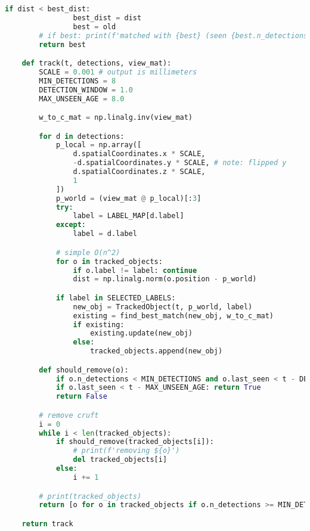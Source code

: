 \begin{lstlisting}[language=python,frame=single]
            if dist < best_dist:
                best_dist = dist
                best = old
        # if best: print(f'matched with {best} (seen {best.n_detections} time(s))')
        return best

    def track(t, detections, view_mat):
        SCALE = 0.001 # output is millimeters
        MIN_DETECTIONS = 8
        DETECTION_WINDOW = 1.0
        MAX_UNSEEN_AGE = 8.0

        w_to_c_mat = np.linalg.inv(view_mat)

        for d in detections:
            p_local = np.array([
                d.spatialCoordinates.x * SCALE,
                -d.spatialCoordinates.y * SCALE, # note: flipped y
                d.spatialCoordinates.z * SCALE,
                1
            ])
            p_world = (view_mat @ p_local)[:3]
            try:
                label = LABEL_MAP[d.label]
            except:
                label = d.label

            # simple O(n^2)
            for o in tracked_objects:
                if o.label != label: continue
                dist = np.linalg.norm(o.position - p_world)

            if label in SELECTED_LABELS:
                new_obj = TrackedObject(t, p_world, label)
                existing = find_best_match(new_obj, w_to_c_mat)
                if existing:
                    existing.update(new_obj)
                else:
                    tracked_objects.append(new_obj)

        def should_remove(o):
            if o.n_detections < MIN_DETECTIONS and o.last_seen < t - DETECTION_WINDOW: return True
            if o.last_seen < t - MAX_UNSEEN_AGE: return True
            return False

        # remove cruft
        i = 0
        while i < len(tracked_objects):
            if should_remove(tracked_objects[i]):
                # print(f'removing ${o}')
                del tracked_objects[i]
            else:
                i += 1

        # print(tracked_objects)
        return [o for o in tracked_objects if o.n_detections >= MIN_DETECTIONS]

    return track


\end{lstlisting}
